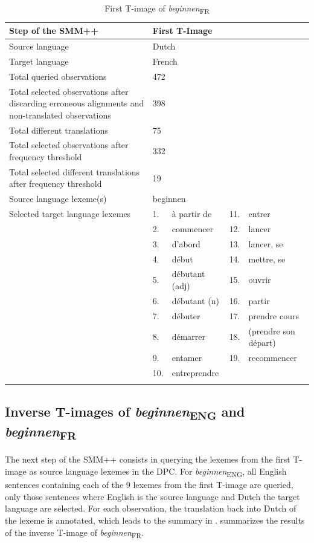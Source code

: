 \begin{table}
\caption{First T-image of \textit{beginnen}\textsubscript{FR}\label{tab:3:7}}
\small
\begin{tabularx}{\textwidth}{p{}lXlX}
\lsptoprule
Step of the SMM++ & \multicolumn{4}{l}{First T-Image}\\ \midrule
\rowcolor{lsLightGray}Source language & \multicolumn{4}{l}{Dutch}\\
Target language & \multicolumn{4}{l}{French}\\
\rowcolor{lsLightGray}Total queried observations & \multicolumn{4}{l}{472}\\
Total selected observations after discarding erroneous alignments and non-translated observations & \multicolumn{4}{l}{398}\\
\rowcolor{lsLightGray}Total different translations & \multicolumn{4}{l}{75}\\
Total selected observations after frequency threshold & \multicolumn{4}{l}{332}\\
\rowcolor{lsLightGray}Total selected different translations after frequency threshold & \multicolumn{4}{l}{19}\\
Source language lexeme(s) & \multicolumn{4}{l}{beginnen}\\
\rowcolor{lsLightGray}Selected target language lexemes &  1.& à partir de & 11.& entrer \\ 
\rowcolor{lsLightGray}& 2. & commencer & 12.& lancer \\ 
\rowcolor{lsLightGray}& 3. & d'abord & 13.& lancer, se \\
\rowcolor{lsLightGray}& 4. & début & 14.& mettre, se \\  
\rowcolor{lsLightGray}& 5. & débutant (adj) & 15.& ouvrir \\
\rowcolor{lsLightGray}& 6. & débutant (n) & 16.& partir \\ 
\rowcolor{lsLightGray}& 7. & débuter & 17.& prendre cours \\  
\rowcolor{lsLightGray}& 8. & démarrer & 18.& (prendre son départ) \\  
\rowcolor{lsLightGray}& 9. &entamer & 19.& recommencer \\
\rowcolor{lsLightGray}& 10.& entreprendre &&  \\
\lspbottomrule
\end{tabularx}
\end{table}
\clearpage
\subsection{Inverse T-images of \textit{beginnen}\textsubscript{ENG} and \textit{beginnen}\textsubscript{FR}}
\label{sec:3.6.2}
The next step of the SMM++ consists in querying the lexemes from the first T-image as source language lexemes in the DPC. For \textit{beginnen}\textsubscript{ENG}, all English sentences containing each of the 9 lexemes from the first T-image are queried, only those sentences where English is the source language and Dutch the target language are selected. For each observation, the translation back into Dutch of the lexeme is annotated, which leads to the summary in .  summarizes the results of the inverse T-image of \textit{beginnen}\textsubscript{FR}.

